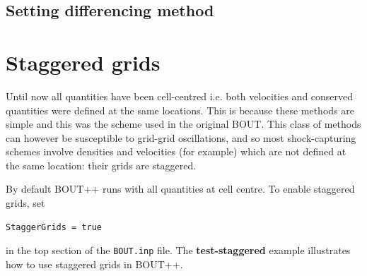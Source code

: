 \documentclass[12pt]{article}
\begin{document}
\subsection{Setting differencing method}

\section{Staggered grids}
\label{sec:staggergrids}
Until now all quantities have been cell-centred i.e. both velocities
and conserved quantities were defined at the same locations. This
is because these methods are simple and this was the scheme used in
the original BOUT. This class of methods can however be susceptible to
grid-grid oscillations, and so most shock-capturing schemes involve
densities and velocities (for example) which are not defined at the same location: their
grids are staggered.

By default BOUT++ runs with all quantities at cell centre. To enable staggered grids,
set
\begin{verbatim}
StaggerGrids = true
\end{verbatim}
in the top section of the \texttt{BOUT.inp} file. The {\bf test-staggered} example
illustrates how to use staggered grids in BOUT++.
\end{document}
